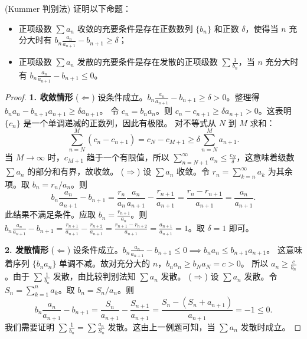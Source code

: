 \documentclass[lang=cn,10pt,thmcnt=section]{elegantbook}
\begin{document}
\begin{example}
    (Kummer 判别法) 证明以下命题：
    \begin{itemize}
        \item 正项级数 $\sum a_n$ 收敛的充要条件是存在正数数列 $\{b_n\}$ 和正数 $\delta$，使得当 $n$ 充分大时有 $b_n \frac{a_n}{a_{n+1}} - b_{n+1} \geq \delta$；
        \item 正项级数 $\sum a_n$ 发散的充要条件是存在发散的正项级数 $\sum \frac{1}{b_n}$，当 $n$ 充分大时有 $b_n \frac{a_n}{a_{n+1}} - b_{n+1} \leq 0$。
    \end{itemize}
\end{example}
\begin{proof}
    \textbf{1. 收敛情形}
    ($\Leftarrow$) 设条件成立。$b_n \frac{a_n}{a_{n+1}} - b_{n+1} \ge \delta > 0$。整理得 $b_n a_n - b_{n+1}a_{n+1} \ge \delta a_{n+1}$。
    令 $c_n = b_n a_n$。则 $c_n - c_{n+1} \ge \delta a_{n+1} > 0$。这表明 $\{c_n\}$ 是一个单调递减的正数列，因此有极限。
    对不等式从 $N$ 到 $M$ 求和：
    \[ \sum_{n=N}^{M} (c_n - c_{n+1}) = c_N - c_{M+1} \ge \delta \sum_{n=N}^{M} a_{n+1}. \]
    当 $M \to \infty$ 时，$c_{M+1}$ 趋于一个有限值，所以 $\sum_{n=N+1}^{\infty} a_n \le \frac{c_N}{\delta}$，这意味着级数 $\sum a_n$ 的部分和有界，故收敛。
    ($\Rightarrow$) 设 $\sum a_n$ 收敛。令 $r_n = \sum_{k=n}^\infty a_k$ 为其余项。取 $b_n = r_n/a_n$。则
    \[ b_n \frac{a_n}{a_{n+1}} - b_{n+1} = \frac{r_n}{a_n}\frac{a_n}{a_{n+1}} - \frac{r_{n+1}}{a_{n+1}} = \frac{r_n - r_{n+1}}{a_{n+1}} = \frac{a_n}{a_{n+1}}. \]
    此结果不满足条件。应取 $b_n = \frac{r_{n+1}}{a_n}$。则 $b_n \frac{a_n}{a_{n+1}} - b_{n+1} = \frac{r_{n+1}}{a_{n+1}} - \frac{r_{n+2}}{a_{n+1}} = \frac{r_{n+1}-r_{n+2}}{a_{n+1}} = \frac{a_{n+1}}{a_{n+1}} = 1$。取 $\delta=1$ 即可。

    \textbf{2. 发散情形}
    ($\Leftarrow$) 设条件成立。$b_n \frac{a_n}{a_{n+1}} - b_{n+1} \le 0 \implies b_n a_n \le b_{n+1} a_{n+1}$。
    这意味着序列 $\{b_n a_n\}$ 单调不减。故对充分大的 $n$，$b_n a_n \ge b_N a_N = c > 0$。
    所以 $a_n \ge \frac{c}{b_n}$。由于 $\sum \frac{1}{b_n}$ 发散，由比较判别法知 $\sum a_n$ 发散。
    ($\Rightarrow$) 设 $\sum a_n$ 发散。令 $S_n = \sum_{k=1}^n a_k$。取 $b_n = S_n/a_n$。则
    \[ b_n \frac{a_n}{a_{n+1}} - b_{n+1} = \frac{S_n}{a_{n+1}} - \frac{S_{n+1}}{a_{n+1}} = \frac{S_n - (S_n+a_{n+1})}{a_{n+1}} = -1 \le 0. \]
    我们需要证明 $\sum \frac{1}{b_n} = \sum \frac{a_n}{S_n}$ 发散。这由上一例题可知，当 $\sum a_n$ 发散时成立。
\end{proof}
\end{document}
